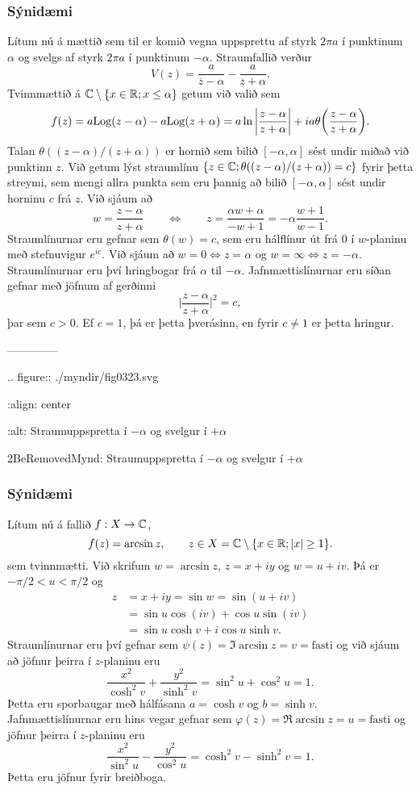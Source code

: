 \subsubsection{Sýnidæmi}  Lítum nú á mættið sem til er komið vegna uppsprettu af styrk
$2\pi a$ í punktinum $\alpha$ og svelgs af styrk $2\pi a$ í punktinum
$-\alpha$.  Straumfallið verður
 $$V(z)=\dfrac {a}{\overline z-\alpha}-\dfrac a{\overline z+\alpha}.
 $$
Tvinnmættið á ${\mathbb C}\setminus\{x\in {\mathbb R}; x\leq \alpha\}$ getum við
valið sem 
 $$f(z)=a{\operatorname{Log}}(z-\alpha)-a{\operatorname{Log}}(z+\alpha)=
a\ln\bigg|\dfrac{z-\alpha}{z+\alpha}
\bigg | +ia\theta\bigg(\dfrac{z-\alpha}{z+\alpha}\bigg).
 $$
Talan $\theta((z-\alpha)/(z+\alpha))$ er hornið sem bilið
$[-\alpha,\alpha]$ sést undir miðað við punktinn $z$.
Við getum lýst straumlínu $\{z\in {\mathbb C}; 
\theta((z-\alpha)/(z+\alpha))=c\}$ fyrir þetta streymi,  sem mengi allra
punkta sem eru þannig að bilið $[-\alpha,\alpha]$ sést undir 
horninu $c$ frá $z$.  
Við sjáum að  
$$w=\dfrac{z-\alpha}{z+\alpha} \qquad \Leftrightarrow \qquad 
z=\dfrac {\alpha w+\alpha}{-w+1}=-\alpha\dfrac{w+1}{w-1}.
 $$
Straumlínurnar eru gefnar sem $\theta(w)=c$, sem eru hálflínur út frá
$0$ í $w$-planinu með stefnuvigur $e^{ic}$.  
Við sjáum að $w=0 \Leftrightarrow z=\alpha$ og
$w=\infty \Leftrightarrow z=-\alpha$. Straumlínurnar eru því
hringbogar frá $\alpha$ til $-\alpha$.
Jafnmættislínurnar eru síðan gefnar með jöfnum af gerðinni
$$
\bigg| \dfrac{z-{\alpha}}{z+{\alpha}} \bigg|^2=c,
$$
þar sem $c>0$.
Ef $c=1$, þá er þetta þverásinn, en fyrir $c\neq 1$ er þetta hringur.

{}


--------------




.. figure:: ./myndir/fig0323.svg

    :align: center

    :alt:  Straumuppspretta í $-\alpha$ og
    svelgur
í $+\alpha$

    2BeRemovedMynd:  Straumuppspretta í $-\alpha$ og
    svelgur
í $+\alpha$


\subsubsection{Sýnidæmi}  Lítum nú á fallið $f:X\to {\mathbb C}$, 
$$
f(z)=\arcsin z, \qquad
z\in X={\mathbb C}\setminus\{x\in {\mathbb R}; |x|\geq 1\}.
$$
sem tvinnmætti.  Við skrifum $w=\arcsin z$, 
$z=x+iy$ og $w=u+iv$.  Þá er $-{\pi}/2<u<{\pi}/2$ og 
\begin{align*}
z&=x+iy=\sin w=\sin(u+iv)\\
&=\sin u\cos(iv)+\cos u\sin(iv)\\
&=\sin u\cosh v+i\cos u\sinh v.
\end{align*}
Straumlínurnar eru því gefnar sem 
${\psi}(z)=\Im \arcsin z=v=\text{fasti}$ 
og við sjáum að jöfnur þeirra í $z$-planinu eru
$$
\dfrac{x^2}{\cosh^2 v}+\dfrac{y^2}{\sinh^2 v}=
\sin^2u+\cos^2u=1.
$$
Þetta eru sporbaugar með hálfásana $a=\cosh v$ og $b=\sinh v$.
Jafnmættislínurnar eru hins vegar gefnar sem
${\varphi}(z)=\Re \arcsin z=u=\text{fasti}$ 
og  jöfnur þeirra í $z$-planinu eru
$$
\dfrac{x^2}{\sin^2 u}-\dfrac{y^2}{\cos^2 u}=
\cosh^2v-\sinh^2v=1.
$$
Þetta eru jöfnur fyrir breiðboga.


